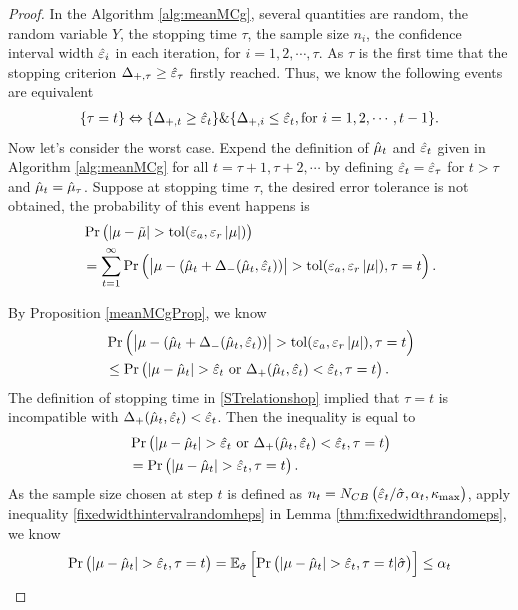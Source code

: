 \documentclass{iitthesis}
\theoremstyle{definition}
\begin{document}
\begin{proof}
In the Algorithm \ref{alg:meanMCg}, several quantities are random, the random variable $Y$, the stopping time $\tau$, the sample size $n_i$,  the confidence interval width $\hat{\varepsilon}_i$ in each iteration, for $i = 1,2,\cdots, \tau$. 
As $\tau$ is the first time that the stopping criterion $\Delta_{+, \tau} \geq \hat{\varepsilon}_\tau$ firstly reached. Thus, we know the following events are equivalent
\begin{align}\label{STrelationshop}
\{\tau = t\} \Leftrightarrow \{\Delta_{+,t} \geq \hat{\varepsilon}_t\} \& \{\Delta_{+,i} \leq \hat{\varepsilon}_t, \text{for }  i = 1,2,\cdots, t-1 \}.
\end{align}
Now let's consider the worst case. Expend the definition of $\hat{\mu}_t$ and $\hat{\varepsilon}_t$ given in Algorithm \ref{alg:meanMCg} for all $t = \tau+1, \tau+2, \cdots$ by defining $\hat{\varepsilon}_t = \hat{\varepsilon}_\tau$ for $t >\tau$ and $\hat{\mu}_t =\hat{\mu}_\tau$. Suppose at stopping time $\tau$, the desired error tolerance is not obtained, the probability of this event happens is
\begin{align}
&\Pr \left( \left \lvert \mu-\tilde{\mu} \right \rvert> \operatorname{tol}(\varepsilon_a,\varepsilon_r\left \lvert \mu \right \rvert)\right)\\
&=\sum_{t=1}^\infty\Pr \left( \left \lvert \mu-(\hat{\mu}_t+\Delta_{-}(\hat{\mu}_t,\hat{\varepsilon}_t)) \right \rvert> \operatorname{tol}(\varepsilon_a,\varepsilon_r\left \lvert \mu \right \rvert), \tau = t  \right) .
\end{align}

By Proposition \ref{meanMCgProp}, we know
\begin{align}
 &\Pr \left( \left \lvert \mu-(\hat{\mu}_t+\Delta_{-}(\hat{\mu}_t,\hat{\varepsilon}_t)) \right \rvert> \operatorname{tol}(\varepsilon_a,\varepsilon_r\left \lvert \mu \right \rvert), \tau = t  \right)\\
&\leq
\Pr \left( \left \lvert \mu-\hat{\mu}_t \right \rvert>\hat{\varepsilon}_t  \text{ or } \Delta_{+}(\hat{\mu}_t,\hat{\varepsilon}_t)<\hat{\varepsilon}_t , \tau = t  \right).
\end{align}
The definition of stopping time in \eqref{STrelationshop} implied that $\tau = t$ is incompatible with $ \Delta_{+}(\hat{\mu}_t,\hat{\varepsilon}_t)<\hat{\varepsilon}_t$. Then the inequality is equal to
\begin{align}
&\Pr \left( \left \lvert \mu-\hat{\mu}_t \right \rvert> \hat{\varepsilon}_t  \text{ or } \Delta_{+}(\hat{\mu}_t,\hat{\varepsilon}_t)<\hat{\varepsilon}_t , \tau = t\right)\\
&= \Pr \left( \left \lvert \mu-\hat{\mu}_t \right \rvert> \hat{\varepsilon}_t, \tau = t \right).\\
\end{align}
As the sample size chosen at step $t$ is defined as $n_t  =N_{CB}\left(\hat{\varepsilon}_t/\hat{\sigma},\alpha_t,\kappa_{\max}\right)$, apply inequality \eqref{fixedwidthintervalrandomheps} in Lemma \ref{thm:fixedwidthrandomeps}, we know
\begin{align}
\Pr \left( \left \lvert \mu-\hat{\mu}_t \right \rvert> \hat{\varepsilon}_t, \tau = t \right)
= \mathbb{E}_{\hat{\sigma}} \left[ \Pr \left( \left \lvert \mu-\hat{\mu}_t \right \rvert> \hat{\varepsilon}_t, \tau = t |\hat{\sigma} \right)\right]
\leq \alpha_t
\end{align}


\end{proof}
\end{document}
